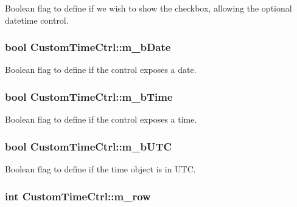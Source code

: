 Boolean flag to define if we wish to show the checkbox, allowing the optional datetime control. 

\hypertarget{class_custom_time_ctrl_ad400f22586d9744343b222469b7b044e}{
\subsubsection[{m\_\-bDate}]{\setlength{\rightskip}{0pt plus 5cm}bool {\bf CustomTimeCtrl::m\_\-bDate}}}
\label{class_custom_time_ctrl_ad400f22586d9744343b222469b7b044e}


Boolean flag to define if the control exposes a date. 

\hypertarget{class_custom_time_ctrl_a0cf32d081f83b97e294f4170845a1439}{
\subsubsection[{m\_\-bTime}]{\setlength{\rightskip}{0pt plus 5cm}bool {\bf CustomTimeCtrl::m\_\-bTime}}}
\label{class_custom_time_ctrl_a0cf32d081f83b97e294f4170845a1439}


Boolean flag to define if the control exposes a time. 

\hypertarget{class_custom_time_ctrl_a561551017a9fde5d281d23fa7c897903}{
\subsubsection[{m\_\-bUTC}]{\setlength{\rightskip}{0pt plus 5cm}bool {\bf CustomTimeCtrl::m\_\-bUTC}}}
\label{class_custom_time_ctrl_a561551017a9fde5d281d23fa7c897903}


Boolean flag to define if the time object is in UTC. 

\hypertarget{class_custom_time_ctrl_aa0677acdf3557d4a7d63b6160f946d26}{
\subsubsection[{m\_\-row}]{\setlength{\rightskip}{0pt plus 5cm}int {\bf CustomTimeCtrl::m\_\-row}}}
\label{class_custom_time_ctrl_aa0677acdf3557d4a7d63b6160f946d26}


